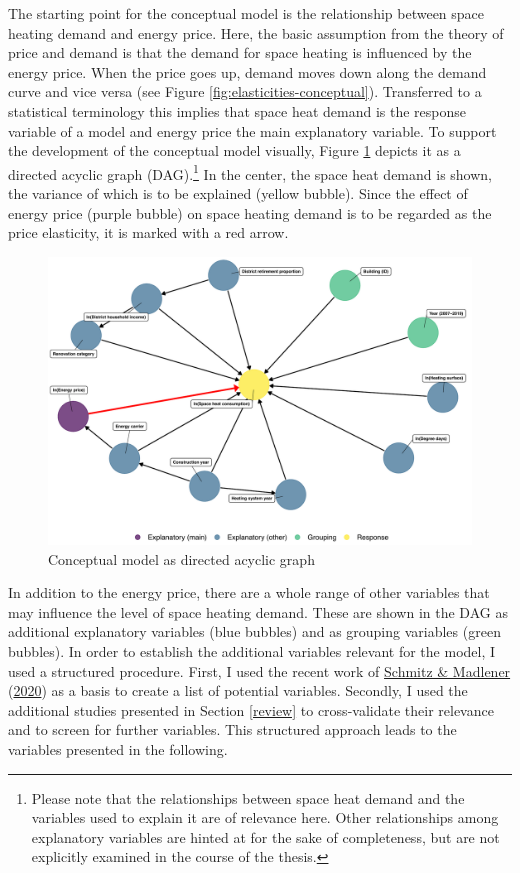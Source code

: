 \documentclass[12pt,twoside]{reedthesis}
\begin{document}
The starting point for the conceptual model is the relationship between space heating demand and energy price. Here, the basic assumption from the theory of price and demand is that the demand for space heating is influenced by the energy price. When the price goes up, demand moves down along the demand curve and vice versa (see Figure \ref{fig:elasticities-conceptual}). Transferred to a statistical terminology this implies that space heat demand is the response variable of a model and energy price the main explanatory variable. To support the development of the conceptual model visually, Figure \ref{fig:dag} depicts it as a directed acyclic graph (DAG).\footnote{Please note that the relationships between space heat demand and the variables used to explain it are of relevance here. Other relationships among explanatory variables are hinted at for the sake of completeness, but are not explicitly examined in the course of the thesis.} In the center, the space heat demand is shown, the variance of which is to be explained (yellow bubble). Since the effect of energy price (purple bubble) on space heating demand is to be regarded as the price elasticity, it is marked with a red arrow.
\begin{figure}

{\centering \includegraphics[width=1\linewidth]{figure/conceptual_dag_red} 

}

\caption[Conceptual model as directed acyclic graph]{Conceptual model as directed acyclic graph}\label{fig:dag}
\end{figure}
In addition to the energy price, there are a whole range of other variables that may influence the level of space heating demand. These are shown in the DAG as additional explanatory variables (blue bubbles) and as grouping variables (green bubbles). In order to establish the additional variables relevant for the model, I used a structured procedure. First, I used the recent work of \protect\hyperlink{ref-schmitz_madlener20}{Schmitz \& Madlener} (\protect\hyperlink{ref-schmitz_madlener20}{2020}) as a basis to create a list of potential variables. Secondly, I used the additional studies presented in Section \ref{review} to cross-validate their relevance and to screen for further variables. This structured approach leads to the variables presented in the following.
\end{document}
